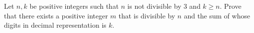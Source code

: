 Let $n,k$ be positive integers such that $n$ is not divisible by $3$ and $k \geq n$. Prove that there exists a positive integer $m$ that is divisible by $n$ and the sum of whose digits in decimal representation is $k$.
